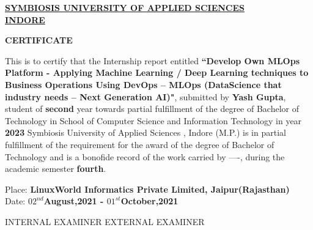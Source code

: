 \documentclass[12pt,oneside,a4paper]{report}
\begin{document}
\newpage

\begin{large}
\begin{center}
\fontsize{18pt}{10pt}\selectfont
\underline{\textbf{SYMBIOSIS UNIVERSITY OF APPLIED SCIENCES}}\\
\vspace{5.0mm}\underline{\textbf{INDORE}}
\end{center}
\end{large}
\vspace{0.35in}
\begin{large}
\begin{center}
\fontsize{16pt}{10pt}\selectfont
\textbf{CERTIFICATE}
\end{center}
\end{large}
\vspace{0.8in}
\doublespacing
\noindent This is to certify that the Internship report entitled \textbf{“Develop Own MLOps Platform - Applying Machine Learning / Deep Learning techniques to Business Operations Using DevOps – MLOps (DataScience that industry needs
– Next Generation AI)"}, submitted by \textbf{Yash Gupta}, student of \textbf{second} year towards partial fulfillment of the degree of Bachelor of Technology in School of Computer Science and Information Technology in year \textbf{2023} Symbiosis University of Applied Sciences , Indore (M.P.) is in partial fulfillment of the requirement for the award of the degree of Bachelor of Technology and is a bonofide record of the work carried by ----, during the academic semester \textbf{fourth}.

\vspace{1.0in}\raggedright
Place: \textbf{LinuxWorld Informatics Private Limited, Jaipur(Rajasthan)}\\Date: \textbf{$02^{nd}$August,2021 - $01^{st}$October,2021}\vspace{1.0in}\\ \vspace{25mm}
\raggedright INTERNAL EXAMINER  \hspace{3.4in}EXTERNAL EXAMINER
\end{document}
